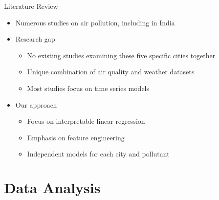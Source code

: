 \documentclass[svgnames, 12pt]{beamer}
\begin{document}
\begin{frame}{Literature Review}
    \begin{itemize}
        \item Numerous studies on air pollution, including in India
        \item Research gap
            \begin{itemize}
                \item No existing studies examining these five specific cities together
                \item Unique combination of air quality and weather datasets
                \item Most studies focus on time series models
            \end{itemize}
        \item Our approach
            \begin{itemize}
                \item Focus on interpretable linear regression
                \item Emphasis on feature engineering
                \item Independent models for each city and pollutant
            \end{itemize}
    \end{itemize}
\end{frame}

\section{Data Analysis}
\end{document}
